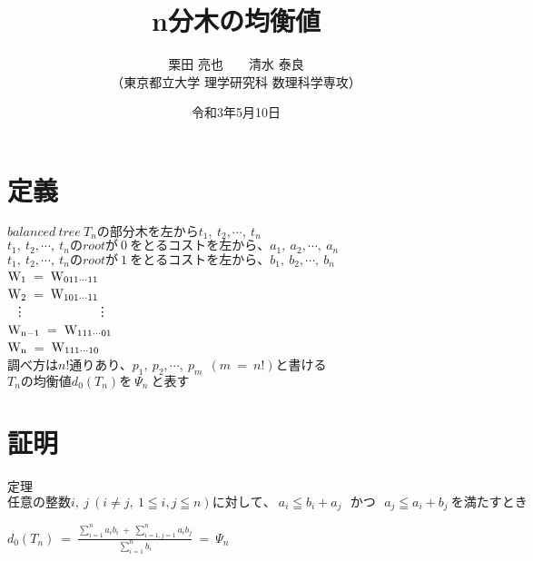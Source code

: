 \documentclass[11pt]{jarticle} %
\title{n分木の均衡値} %
\author{栗田 亮也~~~~清水 泰良\\（東京都立大学 理学研究科 数理科学専攻）} %
\date{令和3年5月10日} %
\begin{document}
\maketitle %


\noindent

\section{定義} %

\begin{center}

  $balanced~tree~T_nの部分木を左からt_1,~t_2,\cdots,~t_n$\\
  $t_1,~t_2,\cdots,~t_nのrootが~0~をとるコストを左から、a_1,~a_2,\cdots,~a_n$\\
  $t_1,~t_2,\cdots,~t_nのrootが~1~をとるコストを左から、b_1,~b_2,\cdots,~b_n$\\
  \vspace{3mm}
  ${\rm W_{1}}$~=~${\rm W_{011\cdots11}}$\\
  ${\rm W_{2}}$~=~${\rm W_{101\cdots11}}$\\
  ~\vdots~~~~~~~~~~~\vdots~~~~~~\\
  ${\rm W_{n-1}}$~=~${\rm W_{111\cdots01}}$~~~~\\
  ${\rm W_{n}}$~=~${\rm W_{111\cdots10}}$\\
  \vspace{3mm}
  調べ方は$n!$通りあり、$p_1,~p_2,\cdots,~p_m~~(m~=~n!)と書ける$\\
  \vspace{3mm}
  $T_nの均衡値d_0(T_n)を~\Psi_n~と表す$
\end{center}

\newpage

\section{証明} %

\begin{itembox}[l]{定理}
  $任意の整数i,~j~(i\ne j,~1\leqq i,j \leqq n)に対して、~ a_i \leqq b_i + a_j ~~~ かつ ~~~ a_j \leqq a_i + b_j ~を満たすとき$
  \begin{center}
    $d_0(T_n) ~ = ~ \displaystyle\frac{\displaystyle\sum_{i=1}^{n}a_ib_i~+~\displaystyle\sum_{i=1,j=1}^{n}a_ib_j}{\displaystyle\sum_{i=1}^{n} b_i} ~ = ~ \Psi_n $
  \end{center}
\end{itembox}\\
\end{document}
